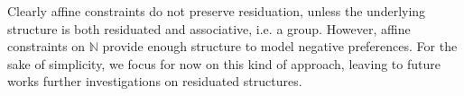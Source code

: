 \documentclass{llncs}
\newcommand{\comment}[1]{}
\def\monid{{\mathbf 0}}
\def\1{{\mathbf 1}}
\def\monid{\mathbf{1}}
\begin{document}
\begin{remark}
Clearly affine constraints do not preserve residuation, unless the underlying structure is both residuated and associative, i.e. a group.
However, affine constraints on $\mathbb{N}$ provide enough structure to model negative preferences. For the sake of simplicity, we focus for now on this kind of approach, leaving to future works further investigations on residuated structures.
\end{remark}
%
\comment{
In order to understand under which conditions, we first
investigate the order.

\begin{lemma}
Let $c_1$, $c_2$ be affine constraints
such that $c_1 \leq c_2$.
If $\1 \in D$, then $i_{c_1} \leq i_{c_2}$.
\end{lemma}
\begin{proof}
Consider the maximal presentations of $c_1$ and $c_2$, $\langle p_{c_1}, i_{c_2} \rangle$ and $\langle p_{c_2}, i_{c_2} \rangle$. Then
\[ c_1 \leq c_2 \iff \langle p_{c_1}, i_{c_1} \rangle \leq \langle p_{c_2}, i_{c_2} \rangle \]
\[ \implies \forall \eta. \bigotimes_{x \in V} \eta(x)^{p_{c_1}(x)} \otimes i_{c_1} \leq \bigotimes_{x \in V} \eta(x)^{p_{c_2}(x)} \otimes i_{c_2} \]
\[ \implies \bigotimes_{x \in V} \monid^{p_{c_1}(x)} \otimes i_{c_1} \leq \bigotimes_{x \in V} \monid^{p_{c_2}(x)} \otimes i_{c_2} \]
\[ \implies i_{c_1} \leq i_{c_2} \]
\qed
\end{proof}
}
\end{document}
